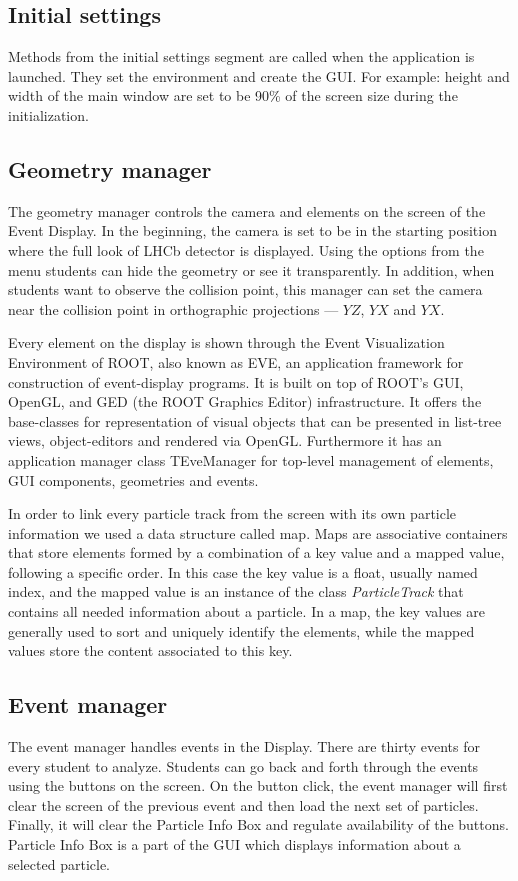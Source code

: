 \documentclass[3p,times,twocolumn]{elsarticle}
\begin{document}
\subsection{Initial settings}
Methods from the initial settings segment are called when the application is launched. They set the environment and create the GUI. For example: height and width of the main window are set to be 90\% of the screen size during the initialization.\par

\subsection{Geometry manager}
The geometry manager controls the camera and elements on the screen of the Event Display. In the beginning, the camera is set to be in the starting position where the full look of LHCb detector is displayed. Using the options from the menu students can hide the geometry or see it transparently. In addition, when students want to observe the collision point, this manager can set the camera near the collision point in orthographic projections --- $YZ$, $YX$ and $YX$.\par
Every element on the display is shown through the Event Visualization Environment of ROOT, also known as EVE, an application framework for construction of event-display programs. It is built on top of ROOT's GUI, OpenGL, and GED (the ROOT Graphics Editor) infrastructure. It offers the base-classes for representation of visual objects that can be presented in list-tree views, object-editors and rendered via OpenGL. Furthermore it has an application manager class TEveManager for top-level management of elements, GUI components, geometries and events. \par
In order to link every particle track from the screen with its own particle information we used a data structure called map. Maps are associative containers that store elements formed by a combination of a key value and a mapped value, following a specific order. In this case the key value is a float, usually named index, and the mapped value is an instance of the class \textit{ParticleTrack} that contains all needed information about a particle. In a map, the key values are generally used to sort and uniquely identify the elements, while the mapped values store the content associated to this key.

\subsection{Event manager}
The event manager handles events in the Display. There are thirty events for every student to analyze. Students can go back and forth through the events using the buttons on the screen. On the button click, the event manager will first clear the screen of the previous event and then load the next set of particles. Finally, it will clear the Particle Info Box and regulate availability of the buttons. Particle Info Box is a part of the GUI which displays information about a selected particle.
\end{document}
